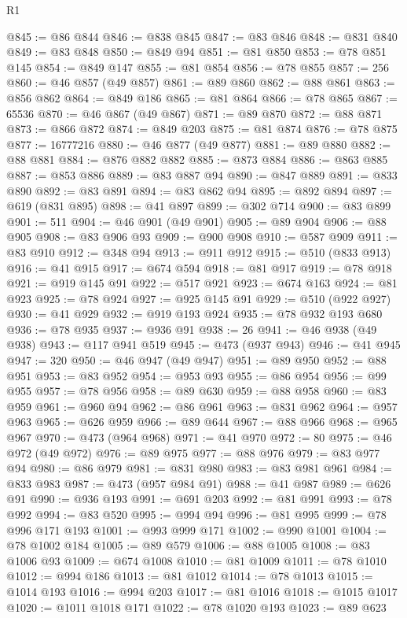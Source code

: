\begin{lexlean}{R1}
\begin{coremodule}
@845 := @86 @844
@846 := @838 @845
@847 := @83 @846
@848 := @831 @840
@849 := @83 @848
@850 := @849 @94
@851 := @81 @850
@853 := @78 @851 @145
@854 := @849 @147
@855 := @81 @854
@856 := @78 @855
@857 := 256
@860 := @46 @857 (@49 @857)
@861 := @89 @860
@862 := @88 @861
@863 := @856 @862
@864 := @849 @186
@865 := @81 @864
@866 := @78 @865
@867 := 65536
@870 := @46 @867 (@49 @867)
@871 := @89 @870
@872 := @88 @871
@873 := @866 @872
@874 := @849 @203
@875 := @81 @874
@876 := @78 @875
@877 := 16777216
@880 := @46 @877 (@49 @877)
@881 := @89 @880
@882 := @88 @881
@884 := @876 @882 @882
@885 := @873 @884
@886 := @863 @885
@887 := @853 @886
@889 := @83 @887 @94
@890 := @847 @889
@891 := @833 @890
@892 := @83 @891
@894 := @83 @862 @94
@895 := @892 @894
@897 := @619 (@831 @895)
@898 := @41 @897
@899 := @302 @714
@900 := @83 @899
@901 := 511
@904 := @46 @901 (@49 @901)
@905 := @89 @904
@906 := @88 @905
@908 := @83 @906 @93
@909 := @900 @908
@910 := @587 @909
@911 := @83 @910
@912 := @348 @94
@913 := @911 @912
@915 := @510 (@833 @913)
@916 := @41 @915
@917 := @674 @594
@918 := @81 @917
@919 := @78 @918
@921 := @919 @145 @91
@922 := @517 @921
@923 := @674 @163
@924 := @81 @923
@925 := @78 @924
@927 := @925 @145 @91
@929 := @510 (@922 @927)
@930 := @41 @929
@932 := @919 @193 @924
@935 := @78 @932 @193 @680
@936 := @78 @935
@937 := @936 @91
@938 := 26
@941 := @46 @938 (@49 @938)
@943 := @117 @941 @519
@945 := @473 (@937 @943)
@946 := @41 @945
@947 := 320
@950 := @46 @947 (@49 @947)
@951 := @89 @950
@952 := @88 @951
@953 := @83 @952
@954 := @953 @93
@955 := @86 @954
@956 := @99 @955
@957 := @78 @956
@958 := @89 @630
@959 := @88 @958
@960 := @83 @959
@961 := @960 @94
@962 := @86 @961
@963 := @831 @962
@964 := @957 @963
@965 := @626 @959
@966 := @89 @644
@967 := @88 @966
@968 := @965 @967
@970 := @473 (@964 @968)
@971 := @41 @970
@972 := 80
@975 := @46 @972 (@49 @972)
@976 := @89 @975
@977 := @88 @976
@979 := @83 @977 @94
@980 := @86 @979
@981 := @831 @980
@983 := @83 @981 @961
@984 := @833 @983
@987 := @473 (@957 @984 @91)
@988 := @41 @987
@989 := @626 @91
@990 := @936 @193
@991 := @691 @203
@992 := @81 @991
@993 := @78 @992
@994 := @83 @520
@995 := @994 @94
@996 := @81 @995
@999 := @78 @996 @171 @193
@1001 := @993 @999 @171
@1002 := @990 @1001
@1004 := @78 @1002 @184
@1005 := @89 @579
@1006 := @88 @1005
@1008 := @83 @1006 @93
@1009 := @674 @1008
@1010 := @81 @1009
@1011 := @78 @1010
@1012 := @994 @186
@1013 := @81 @1012
@1014 := @78 @1013
@1015 := @1014 @193
@1016 := @994 @203
@1017 := @81 @1016
@1018 := @1015 @1017
@1020 := @1011 @1018 @171
@1022 := @78 @1020 @193
@1023 := @89 @623

\end{coremodule}
\end{lexlean}
